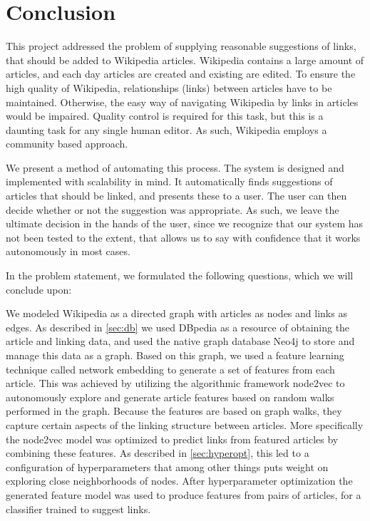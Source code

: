 \chapter{Conclusion}\label{chap:conclusion}
This project addressed the problem of supplying reasonable suggestions of links, that should be added to Wikipedia articles. Wikipedia contains a large amount of articles, and each day articles are created and existing are edited. To ensure the high quality of Wikipedia, relationships (links) between articles have to be maintained. Otherwise, the easy way of navigating Wikipedia by links in articles would be impaired. Quality control is required for this task, but this is a daunting task for any single human editor. As such, Wikipedia employs a community based approach. 

We present a method of automating this process. The system is designed and implemented with scalability in mind. It automatically finds suggestions of articles that should be linked, and presents these to a user. The user can then decide whether or not the suggestion was appropriate. As such, we leave the ultimate decision in the hands of the user, since we recognize that our system has not been tested to the extent, that allows us to say with confidence that it works autonomously in most cases.

In the problem statement, we formulated the following questions, which we will conclude upon:

\subproblems


We modeled Wikipedia as a directed graph with articles as nodes and links as edges. As described in \cref{sec:db} we used DBpedia as a resource of obtaining the article and linking data, and used the native graph database Neo4j to store and manage this data as a graph. Based on this graph, we used a feature learning technique called network embedding to generate a set of features from each article. This was achieved by utilizing the algorithmic framework node2vec to autonomously explore and generate article features based on random walks performed in the graph. Because the features are based on graph walks, they capture certain aspects of the linking structure between articles. More specifically the node2vec model was optimized to predict links from featured articles by combining these features. As described in \cref{sec:hyperopt}, this led to a configuration of hyperparameters that among other things puts weight on exploring close neighborhoods of nodes. After hyperparameter optimization the generated feature model was used to produce features from pairs of articles, for a classifier trained to suggest links.

